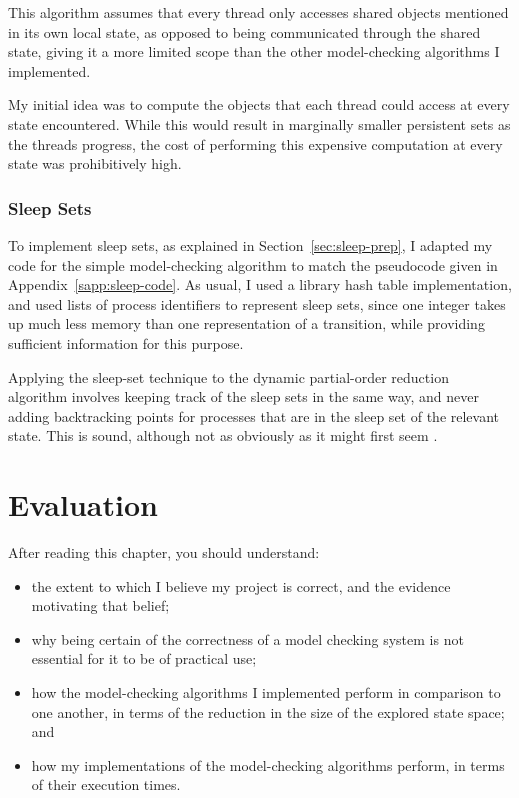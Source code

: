 \documentclass[12pt,a4paper,twoside,openright]{report}
\newenvironment{understandinglist}
	{\begin{itemize} \itemsep 0em}{\end{itemize}}
\begin{document}
This algorithm assumes that every thread only
accesses shared objects mentioned in its own
local state, as opposed to being communicated
through the shared state, giving it a more
limited scope than the other model-checking
algorithms I implemented.

My initial idea was to compute the objects that
each thread could access at every state encountered.
While this would result in marginally smaller
persistent sets as the threads progress, the cost
of performing this expensive computation at
every state was prohibitively high.


\subsection{Sleep Sets}

To implement sleep sets, as
explained in Section~\ref{sec:sleep-prep},
I adapted my
code for the simple model-checking
algorithm to match the pseudocode
given in Appendix~\ref{sapp:sleep-code}.
As usual, I used a
library hash table implementation,
and used lists of process identifiers
to represent sleep sets, since one
integer takes up much less memory
than one representation of a transition,
while providing sufficient information
for this purpose.

Applying the sleep-set technique to the
dynamic partial-order reduction
algorithm involves keeping track of the
sleep sets in the same way, and never
adding backtracking points for
processes that are in the sleep set
of the relevant state. This is
sound, although not as obviously as
it might first seem \cite{flan05addm}.

\chapter{Evaluation}
\label{cha:evaluation}

After reading this chapter,
you should understand:
\begin{understandinglist}
	\item the extent to which I believe
	my project is correct, and the evidence
	motivating that belief;
	\item why being certain of the
	correctness of a model checking
	system is not essential for it
	to be of practical use;
	\item how the model-checking
	algorithms I implemented perform
	in comparison to one another,
	in terms of the reduction in the
	size of the explored state space; and
	\item how my implementations
	of the model-checking algorithms
	perform, in terms of their
	execution times.
\end{understandinglist}
\end{document}
